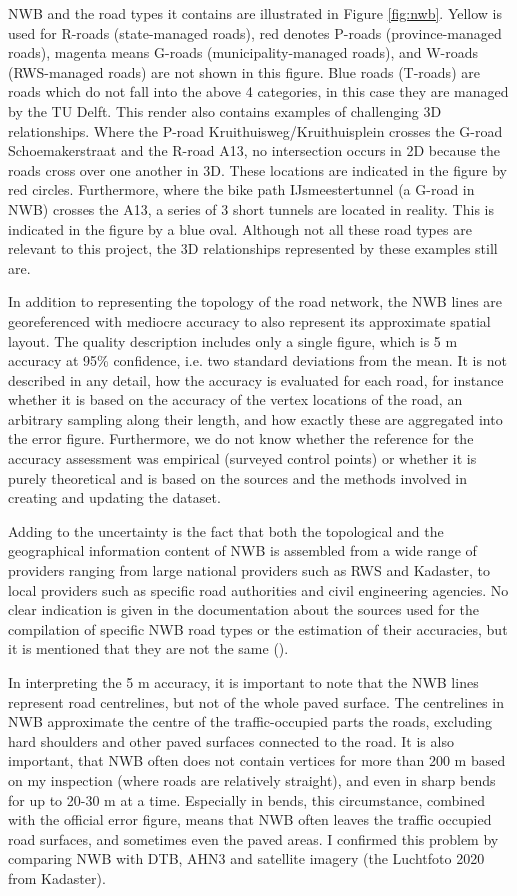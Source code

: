 NWB and the road types it contains are illustrated in Figure \ref{fig:nwb}. Yellow is used for R-roads (state-managed roads), red denotes P-roads (province-managed roads), magenta means G-roads (municipality-managed roads), and W-roads (RWS-managed roads) are not shown in this figure. Blue roads (T-roads) are roads which do not fall into the above 4 categories, in this case they are managed by the TU Delft. This render also contains examples of challenging 3D relationships. Where the P-road Kruithuisweg/Kruithuisplein crosses the G-road Schoemakerstraat and the R-road A13, no intersection occurs in 2D because the roads cross over one another in 3D. These locations are indicated in the figure by red circles. Furthermore, where the bike path IJsmeestertunnel (a G-road in NWB) crosses the A13, a series of 3 short tunnels are located in reality. This is indicated in the figure by a blue oval. Although not all these road types are relevant to this project, the 3D relationships represented by these examples still are.

In addition to representing the topology of the road network, the NWB lines are georeferenced with mediocre accuracy to also represent its approximate spatial layout. The quality description includes only a single figure, which is 5 m accuracy at 95\% confidence, i.e. two standard deviations from the mean. It is not described in any detail, how the accuracy is evaluated for each road, for instance whether it is based on the accuracy of the vertex locations of the road, an arbitrary sampling along their length, and how exactly these are aggregated into the error figure. Furthermore, we do not know whether the reference for the accuracy assessment was empirical (surveyed control points) or whether it is purely theoretical and is based on the sources and the methods involved in creating and updating the dataset.

Adding to the uncertainty is the fact that both the topological and the geographical information content of NWB is assembled from a wide range of providers ranging from large national providers such as RWS and Kadaster, to local providers such as specific road authorities and civil engineering agencies. No clear indication is given in the documentation about the sources used for the compilation of specific NWB road types or the estimation of their accuracies, but it is mentioned that they are not the same (\cite{nwb_docs}).

In interpreting the 5 m accuracy, it is important to note that the NWB lines represent road centrelines, but not of the whole paved surface. The centrelines in NWB approximate the centre of the traffic-occupied parts the roads, excluding hard shoulders and other paved surfaces connected to the road. It is also important, that NWB often does not contain vertices for more than 200 m based on my inspection (where roads are relatively straight), and even in sharp bends for up to 20-30 m at a time. Especially in bends, this circumstance, combined with the official error figure, means that NWB often leaves the traffic occupied road surfaces, and sometimes even the paved areas. I confirmed this problem by comparing NWB with DTB, AHN3 and satellite imagery (the Luchtfoto 2020 from Kadaster).

